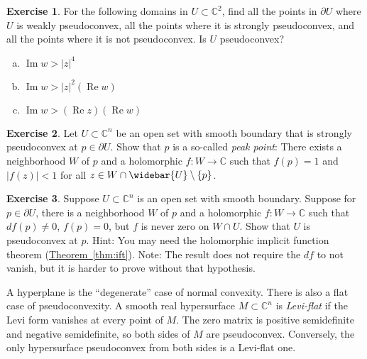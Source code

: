 \documentclass[12pt,openany]{book}
\renewcommand{\Re}{\operatorname{Re}}
\renewcommand{\Im}{\operatorname{Im}}
\newcommand{\sabs}[1]{\lvert {#1} \rvert}
\newcommand{\C}{{\mathbb{C}}}
\newcommand{\myindex}[1]{#1\index{#1}}
\theoremstyle{plain}
\theoremstyle{remark}
\theoremstyle{definition}
\newenvironment{exbox}{%
    \def\FrameCommand{\vrule width 1pt \relax\hspace{10pt}}%
    \MakeFramed{\advance\hsize-\width\FrameRestore}%
}{%
    \endMakeFramed
}
\newenvironment{exparts}{%
    \leavevmode\begin{enumerate}[a),noitemsep,topsep=0pt,parsep=0pt,partopsep=0pt]
}{%
    \end{enumerate}
}
\theoremstyle{exercise}
\newtheorem{exercise}{Exercise}[section]
\theoremstyle{example}
\newcommand{\thmref}[1]{\hyperref[#1]{Theorem~\ref*{#1}}}
\begin{document}
\begin{exbox}
\begin{exercise}
\pagebreak[2]
For the following domains in $U \subset \C^2$,
find all the
points in $\partial U$ where $U$ is weakly pseudoconvex, all the points
where it is strongly pseudoconvex, and all the points where it is
not pseudoconvex.  Is $U$ pseudoconvex?
\begin{exparts}
\item
$\Im w > \sabs{z}^4$
\item
$\Im w > \sabs{z}^2(\Re w)$
\item
$\Im w > (\Re z)(\Re w)$
\end{exparts}
\end{exercise}

\begin{exercise}
\pagebreak[2]
Let $U \subset \C^n$ be an open set with smooth boundary that is
strongly pseudoconvex at $p \in \partial U$.  Show that
$p$ is a so-called \emph{\myindex{peak point}}: There
exists a neighborhood $W$ of $p$ and a holomorphic
$f \colon W \to \C$ such that $f(p)=1$ and $\sabs{f(z)} < 1$ for all
$z \in W \cap \widebar{U} \setminus \{ p \}$.
\end{exercise}

\begin{exercise}
Suppose $U \subset \C^n$ is an open set with smooth boundary.  Suppose
for $p \in \partial U$, there is a neighborhood $W$ of $p$
and a holomorphic $f \colon W \to
\C$ such that $df(p) \not= 0$, $f(p) = 0$, but
$f$ is never zero on $W \cap U$.  Show that $U$ is pseudoconvex
at $p$.  Hint: You may need the holomorphic implicit function theorem
(\thmref{thm:ift}).
Note: The result does not require the $df$ to not vanish, but it is
harder to prove without that hypothesis.
\end{exercise}
\end{exbox}

A hyperplane is the ``degenerate'' case of normal convexity.
There is also a flat case of pseudoconvexity.  A smooth real hypersurface
$M \subset \C^n$ is \emph{\myindex{Levi-flat}} if the Levi form
vanishes at every point of $M$.  The zero matrix is positive semidefinite
and negative semidefinite, so both sides of $M$ are pseudoconvex.
Conversely, the only hypersurface pseudoconvex from both sides is a
Levi-flat one.
\end{document}
